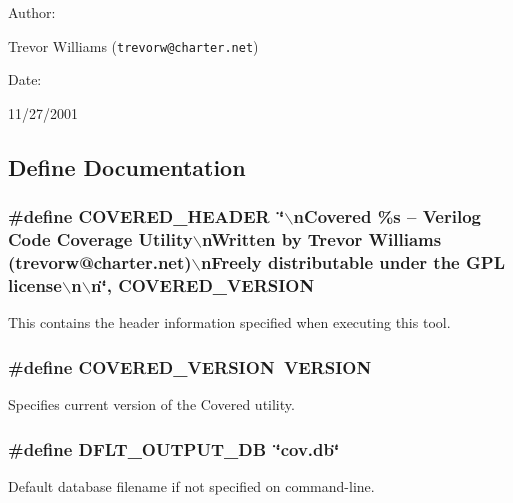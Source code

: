 \begin{Desc}
\item[Author: ]\par
Trevor Williams ({\tt trevorw@charter.net}) \end{Desc}
\begin{Desc}
\item[Date: ]\par
11/27/2001\end{Desc}


\subsection{Define Documentation}
\subsubsection{\setlength{\rightskip}{0pt plus 5cm}\#define COVERED\_\-HEADER\ \char`\"{}$\backslash$n\-Covered \%s -- Verilog Code Coverage Utility$\backslash$n\-Written by Trevor Williams  (trevorw@charter.net)$\backslash$n\-Freely distributable under the GPL license$\backslash$n$\backslash$n\char`\"{}, COVERED\_\-VERSION}\label{defines_8h_a1}


This contains the header information specified when executing this tool. 
\subsubsection{\setlength{\rightskip}{0pt plus 5cm}\#define COVERED\_\-VERSION\ VERSION}\label{defines_8h_a0}


Specifies current version of the Covered utility. 
\subsubsection{\setlength{\rightskip}{0pt plus 5cm}\#define DFLT\_\-OUTPUT\_\-DB\ \char`\"{}cov.db\char`\"{}}\label{defines_8h_a2}


Default database filename if not specified on command-line. 
